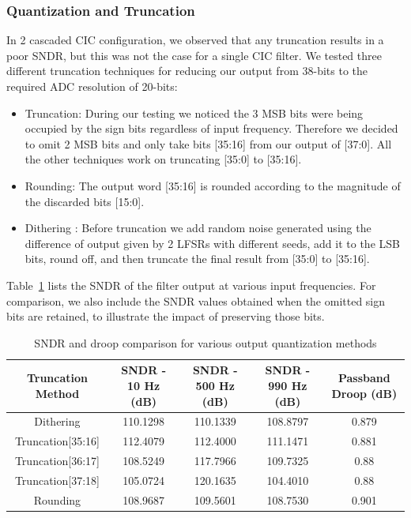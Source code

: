 \documentclass[11pt,onecolumn]{IEEEtran}
\begin{document}
\subsubsection{Quantization and Truncation}
In 2 cascaded CIC configuration, we observed that any truncation results in a poor SNDR, but this was not the case for a single CIC filter. We tested three different truncation techniques for reducing our output from 38-bits to the required ADC resolution of 20-bits:
\begin{itemize}
    \item Truncation: During our testing we noticed the 3 MSB bits were being occupied by the sign bits regardless of input frequency. Therefore we decided to omit 2 MSB bits and only take bits [35:16] from our output of [37:0]. All the other techniques work on truncating [35:0] to [35:16].
    \item Rounding: The output word [35:16] is rounded according to the magnitude of the discarded bits [15:0].
    \item Dithering \cite{Dithering}:  Before truncation we add random noise generated using the difference of output given by 2 LFSRs \cite{LFSR} with different seeds, add it to the LSB bits, round off, and then truncate the final result from [35:0] to [35:16].
\end{itemize}
Table~\ref{tab:truncation_sndr_comparison} lists the SNDR of the filter output at various input frequencies. For comparison, we also include the SNDR values obtained when the omitted sign bits are retained, to illustrate the impact of preserving those bits.
\begin{table}[h!]
\centering
\begin{tabular}{|c|c|c|c|c|}
\hline
\textbf{Truncation Method} & \textbf{SNDR - 10 Hz (dB)} & \textbf{SNDR - 500 Hz (dB)} & \textbf{SNDR - 990 Hz (dB)} & \textbf{Passband Droop (dB)} \\ \hline
Dithering  & 110.1298 & 110.1339 & 108.8797 & 0.879 \\ \hline
Truncation[35:16] & 112.4079 & 112.4000 & 111.1471 & 0.881 \\ \hline
Truncation[36:17] & 108.5249 & 117.7966 & 109.7325 & 0.88 \\ \hline
Truncation[37:18] & 105.0724 & 120.1635 & 104.4010 & 0.88 \\ \hline
Rounding   & 108.9687 & 109.5601 & 108.7530 & 0.901 \\ \hline
\end{tabular}
\caption{SNDR and droop comparison for various output quantization methods}
\label{tab:truncation_sndr_comparison}
\end{table}
\vspace{-1mm}
\end{document}
